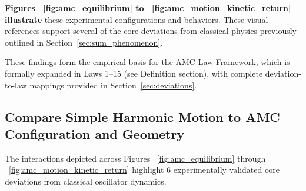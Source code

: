 \documentclass[10pt,aps,pre,onecolumn,superscriptaddress,notitlepage]{revtex4-2}
\begin{document}
\textbf{Figures ~\ref{fig:amc_equilibrium} to ~\ref{fig:amc_motion_kinetic_return} illustrate} these experimental configurations and behaviors. These visual references support several of the core deviations from classical physics previously outlined in Section~\ref{sec:sum_phenomenon}.

These findings form the empirical basis for the AMC Law Framework, which is formally expanded in Laws 1--15 (see Definition section), with complete deviation-to-law mappings provided in Section~\ref{sec:deviations}.
\clearpage
\subsection{Compare Simple Harmonic Motion to AMC Configuration and Geometry}
The interactions depicted across Figures ~\ref{fig:amc_equilibrium} through ~\ref{fig:amc_motion_kinetic_return} highlight 6 experimentally validated core deviations from classical oscillator dynamics.
\end{document}
